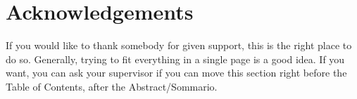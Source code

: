 \chapter*{Acknowledgements}
If you would like to thank somebody for given support, this is the right place to do so. Generally, trying to  fit everything in a single page is a good idea. If you want, you can ask your supervisor if you can move this section right before the Table of Contents, after the Abstract/Sommario.